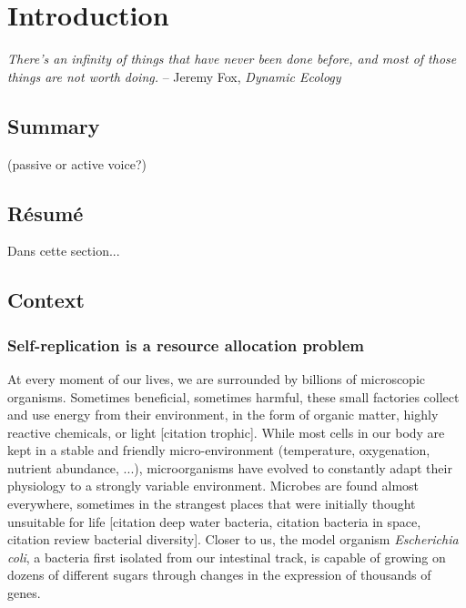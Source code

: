 \chapter{Introduction}

\textit{There's an infinity of things that have never been done before, and most of those things are not worth doing.} -- Jeremy Fox, \textit{Dynamic Ecology}~\cite{fox_how_2016}

\section*{Summary}

(passive or active voice?)


\section*{Résumé}

Dans cette section...

\section{Context}
\label{sec:context}

\subsection{Self-replication is a resource allocation problem}

At every moment of our lives, we are surrounded by billions of microscopic organisms.
Sometimes beneficial, sometimes harmful, these small factories collect and use energy from their environment, in the form of organic matter, highly reactive chemicals, or light [citation trophic].
While most cells in our body are kept in a stable and friendly micro-environment (temperature, oxygenation, nutrient abundance, ...), microorganisms have evolved to constantly adapt their physiology to a strongly variable environment.
Microbes are found almost everywhere, sometimes in the strangest places that were initially thought unsuitable for life [citation deep water bacteria, citation bacteria in space, citation review bacterial diversity].
Closer to us, the model organism \textit{Escherichia coli}, a bacteria first isolated from our intestinal track, is capable of growing on dozens of different sugars through changes in the expression of thousands of genes\cite{zimmer_microcosm:_2009}.

